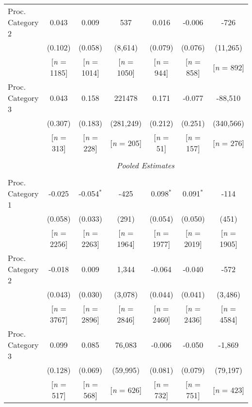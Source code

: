 \documentclass[border = 1pt$]{standalone}
\begin{document}
\begin{tabular}{@{\extracolsep{6pt}}lcccccc}
Proc. Category 2  & 0.043   & 0.009   & 537      & 0.016         & -0.006        & -726        \\[1.0ex]
                     & (0.102) & (0.058) & (8,614)   & (0.079)       & (0.076)       & (11,265)     \\[1.0ex]
                     & [\emph{n} = 1185] & [\emph{n} = 1014] & [\emph{n} = 1050] & [\emph{n} = 944]  & [\emph{n} = 858]  & [\emph{n} = 892]  \\[1.0ex]
Proc. Category 3 & 0.043   & 0.158   & 221478   & 0.171         & -0.077        & -88,510      \\[1.0ex]
                     & (0.307) & (0.183) & (281,249) & (0.212)       & (0.251)       & (340,566)    \\[1.0ex]
                     & [\emph{n} = 313]  & [\emph{n} = 228]  & [\emph{n} = 205]  & [\emph{n} = 51]   & [\emph{n} = 157]  & [\emph{n} = 276]  \\[1.0ex]
\hline \\[-.8ex] & \multicolumn{6}{c}{\emph{Pooled Estimates}} \\[1.0ex]
\cline{2-7} \\[-.8ex]
Proc. Category 1   & -0.025  & -0.054$^{*}$ & -425    & 0.098$^{*}$ & 0.091$^{*}$ & -114    \\[1.0ex]
                     & (0.058) & (0.033)      & (291)   & (0.054)     & (0.050)     & (451)   \\[1.0ex]
                     & [\emph{n} = 2256] & [\emph{n} = 2263] & [\emph{n} = 1964] & [\emph{n} = 1977] & [\emph{n} = 2019] & [\emph{n} = 1905] \\[1.0ex]
Proc. Category 2  & -0.018  & 0.009        & 1,344    & -0.064      & -0.040      & -572    \\[1.0ex]
                     & (0.043) & (0.030)      & (3,078)  & (0.044)     & (0.041)     & (3,486)  \\[1.0ex]
                     & [\emph{n} = 3767] & [\emph{n} = 2896] & [\emph{n} = 2846] & [\emph{n} = 2460] & [\emph{n} = 2436] & [\emph{n} = 4584] \\[1.0ex]
Proc. Category 3 & 0.099   & 0.085        & 76,083   & -0.006      & -0.050      & -1,869   \\[1.0ex]
                     & (0.128) & (0.069)      & (59,995) & (0.081)     & (0.079)     & (79,197) \\[1.0ex]
                     & [\emph{n} = 517]  & [\emph{n} = 568]  & [\emph{n} = 626]  & [\emph{n} = 732]  & [\emph{n} = 751]  & [\emph{n} = 423]  \\[1.0ex]

\end{tabular}
\end{document}

